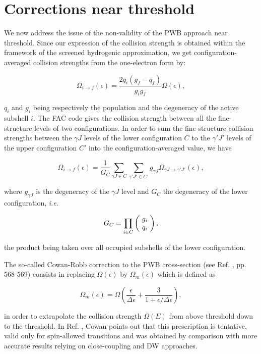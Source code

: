 \documentclass[a4paper,10pt]{article}
\begin{document}
\section{Corrections near threshold}\label{sec3}

We now address the issue of the non-validity of the PWB approach near threshold. Since our expression of the collision strength is obtained within the framework of the screened hydrogenic approximation, we get configuration-averaged collision strengths from the one-electron form by:

\begin{equation*}
\Omega_{i\rightarrow f}(\epsilon)=\frac{2q_{i}(g_f-q_f)}{g_{i}g_f}\Omega(\epsilon),
\end{equation*}

\noindent $q_i$ and $g_i$ being respectively the population and the degeneracy of the active subshell $i$. The FAC code \cite{GU08} gives the collision strength between all the fine-structure levels of two configurations. In order to sum the fine-structure collision strengths between the $\gamma J$ levels of the lower configuration $C$ to the $\gamma'J'$ levels of the upper configuration $C'$ into the configuration-averaged value, we have

\begin{equation*}
\Omega_{i\rightarrow f}(\epsilon)=\frac{1}{G_C}\sum_{\gamma J\in C}\sum_{\gamma' J'\in C'}g_{\gamma J}\Omega_{\gamma J\rightarrow\gamma'J'}(\epsilon),
\end{equation*}

\noindent where $g_{\gamma J}$ is the degeneracy of the $\gamma J$ level and $G_C$ the degeneracy of the lower configuration, \textit{i.e.}

\begin{equation*}
G_C=\prod_{i\in C}\left(\begin{array}{c}\!g_i\!\\\!q_i\!\end{array}\right),
\end{equation*}

\noindent the product being taken over all occupied subshells of the lower configuration.

The so-called Cowan-Robb correction to the PWB cross-section (see Ref. \cite{COWAN81}, pp. 568-569) consists in replacing $\Omega(\epsilon)$ by $\Omega_m(\epsilon)$ which is defined as 

\begin{equation*}
\Omega_m(\epsilon)=\Omega\left(\frac{\epsilon}{\Delta\epsilon}+\frac{3}{1+\epsilon/\Delta \epsilon}\right),
\end{equation*}

\noindent in order to extrapolate the collision strength $\Omega(E)$ from above threshold down to the threshold. In Ref. \cite{COWAN81}, Cowan points out that this prescription is tentative, valid only for spin-allowed transitions and was obtained by comparison with more accurate results relying on close-coupling and DW approaches.
\end{document}
